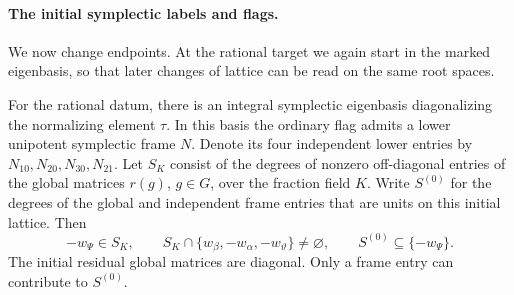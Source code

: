 \paragraph{The initial symplectic labels and flags.}
\label{par:count-two-labels}
We now change endpoints. At the rational target we again start in the marked
eigenbasis, so that later changes of lattice can be read on the same root spaces.

\begin{lemma}
\label{lem:rational-rank-four-marking}
For the rational datum, there is an integral symplectic
eigenbasis diagonalizing the normalizing element \(\tau\).
In this basis the ordinary flag admits a lower unipotent
symplectic frame \(N\). Denote its four independent lower entries by
\(N_{10},N_{20},N_{30},N_{21}\). Let \(S_K\) consist of the degrees
of nonzero off-diagonal entries of the global matrices \(r(g)\),
\(g\in G\), over the fraction field \(K\). Write \(S^{(0)}\)
for the degrees of the global and independent frame entries
that are units on this initial lattice. Then
\[
 -w_\Psi\in S_K,\qquad
 S_K\cap\{w_\beta,-w_\alpha,-w_\vartheta\}\ne\varnothing,
 \qquad S^{(0)}\subseteq\{-w_\Psi\}.
\]
The initial residual global matrices are diagonal. Only a frame
entry can contribute to \(S^{(0)}\).
\end{lemma}

